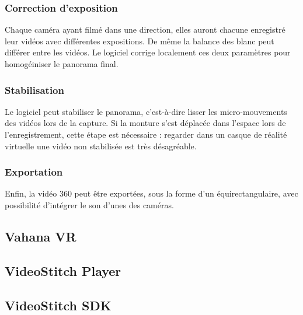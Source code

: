\subsubsection{Correction d'exposition}
Chaque caméra ayant filmé dans une direction, elles auront chacune enregistré leur
vidéos avec différentes expositions. De même la balance des blanc peut différer
entre les vidéos. Le logiciel corrige localement ces deux paramètres pour homogéiniser
le panorama final.

\subsubsection{Stabilisation}
Le logiciel peut stabiliser le panorama, c'est-à-dire lisser les micro-mouvements 
des vidéos lors de la capture. Si la monture s'est déplacée dans l'espace lors
de l'enregistrement, cette étape est nécessaire : regarder dans un casque de réalité
virtuelle une vidéo non stabilisée est très désagréable.

\subsubsection{Exportation}
Enfin, la vidéo 360 peut être exportées, sous la forme d'un équirectangulaire, avec
possibilité d'intégrer le son d'unes des caméras.

\subsection{Vahana VR}

\subsection{VideoStitch Player}
\subsection{VideoStitch SDK}

